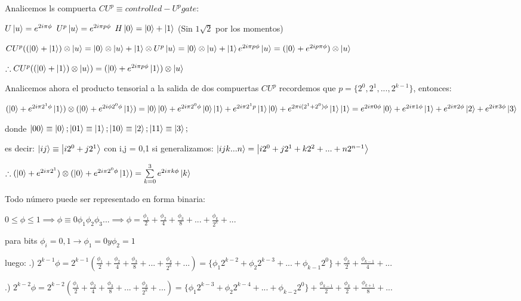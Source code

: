 
Analicemos ls compuerta $CU^p \equiv controlled-U^p gate$:


$U \ket{u} = e^{2 i \pi \phi}$
$U^p \ket{u} = e^{2 i \pi p \phi}$
$H \ket{0} = \ket{0} + \ket{1}$ (Sin $1\sqrt{2}$ por los momentos)

$CU^p ((\ket{0} + \ket{1}) \otimes \ket{u} = \ket{0} \otimes \ket{u} + \ket{1} \otimes U^p \ket{u} = \ket{0} \otimes \ket{u} + \ket{1} e^{2i \pi p \phi} \ket{u} = (\ket{0} + e^{2 i p \pi \phi}) \otimes \ket{u}$

$\therefore CU^p ((\ket{0} + \ket{1}) \otimes \ket{u}) = (\ket{0} + e^{2 i \pi p \phi} \ket{1}) \otimes \ket{u}$

Analicemos ahora el producto tensorial a la salida de dos compuertas $CU^p$ recordemos que $p = \{2^0, 2^1, ..., 2^{k-1}\}$, entonces:

$(\ket{0} + e^{2 i \pi 2^1 \phi} \ket{1}) \otimes (\ket{0} + e^{2 i \phi 2^0 \phi} \ket{1}) = \ket{0} \ket{0} + e^{2 i \pi 2^0 \phi} \ket{0} \ket{1} + e^{2 i \pi 2^1 p} \ket{1} \ket{0} + e^{2 \pi i (2^1 + 2^0) \phi} \ket{1} \ket{1} = e^{2 i \pi 0 \phi} \ket{0} + e^{2 i \pi 1 \phi} \ket{1} + e^{2 i \pi 2 \phi} \ket{2} + e^{2 i \pi 3 \phi} \ket{3}$

donde $\ket{00} \equiv \ket{0}; \ket{01} \equiv \ket{1}; \ket{10} \equiv \ket{2}; \ket{11} \equiv \ket{3};$

es decir: $\ket{ij} \equiv \ket{i 2^0 + j 2^1}$ con i,j = 0,1
si generalizamos: $\ket{i j k ... n} = \ket{i 2^0 + j 2^1 + k 2^2 + ... + n 2^{n-1}}$

$\therefore (\ket{0} + e^{2 i \pi 2^1}) \otimes (\ket{0} + e^{2 i \pi 2^0 \phi} \ket{1}) = \sum\limits_{k = 0}^3 e^{2i \pi k \phi} \ket{k}$

Todo número puede ser representado en forma binaria:

$0 \leq \phi \leq 1 \implies \phi \equiv 0 \phi_1 \phi_2 \phi_3 ... \implies \phi = \frac{\phi_1}{2} + \frac{\phi_2}{4} + \frac{\phi_3}{8} + ... + \frac{\phi_k}{2^k} + ...$

para bits $\phi_i = 0,1 \rightarrow \phi_1 = 0 y \phi_2 = 1$

luego: .) $2^{k-1} \phi = 2^{k-1} ( \frac{\phi_1}{2} + \frac{\phi_2}{4} + \frac{\phi_3}{8} + ... + \frac{\phi_k}{2^k} + ...) = \{\phi_1 2^{k-2} + \phi_2 2^{k-3} + ... + \phi_{k-1} 2^0\} + \frac{\phi_k}{2} + \frac{\phi_{k-1}}{4} + ...$

.) $2^{k-2} \phi = 2^{k-2} ( \frac{\phi_1}{2} + \frac{\phi_2}{4} + \frac{\phi_3}{8} + ... + \frac{\phi_k}{2^k} + ...) = \{\phi_1 2^{k-3} + \phi_2 2^{k-4} + ... + \phi_{k-2} 2^0\} + \frac{\phi_{k-1}}{2} + \frac{\phi_k}{2} + \frac{\phi_{k+1}}{8} + ...$

